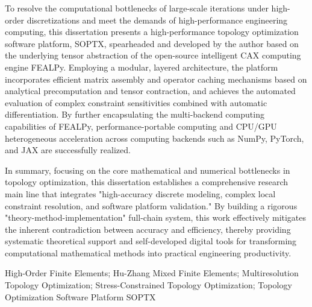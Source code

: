\begin{enabstract}
	To resolve the computational bottlenecks of large-scale iterations under high-order discretizations and meet the demands of high-performance engineering computing, this dissertation presents a high-performance topology optimization software platform, SOPTX, spearheaded and developed by the author based on the underlying tensor abstraction of the open-source intelligent CAX computing engine FEALPy. Employing a modular, layered architecture, the platform incorporates efficient matrix assembly and operator caching mechanisms based on analytical precomputation and tensor contraction, and achieves the automated evaluation of complex constraint sensitivities combined with automatic differentiation. By further encapsulating the multi-backend computing capabilities of FEALPy, performance-portable computing and CPU/GPU heterogeneous acceleration across computing backends such as NumPy, PyTorch, and JAX are successfully realized.
	
	In summary, focusing on the core mathematical and numerical bottlenecks in topology optimization, this dissertation establishes a comprehensive research main line that integrates "high-accuracy discrete modeling, complex local constraint resolution, and software platform validation." By building a rigorous "theory-method-implementation" full-chain system, this work effectively mitigates the inherent contradiction between accuracy and efficiency, thereby providing systematic theoretical support and self-developed digital tools for transforming computational mathematical methods into practical engineering productivity.
	
\end{enabstract}

\begin{enkeywords}
	High-Order Finite Elements; Hu-Zhang Mixed Finite Elements; Multiresolution Topology Optimization; Stress-Constrained Topology Optimization; Topology Optimization Software Platform SOPTX
\end{enkeywords}